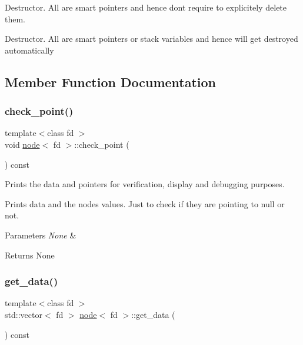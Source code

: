 Destructor. All are smart pointers and hence don\textquotesingle{}t require to explicitely delete them. 

Destructor. All are smart pointers or stack variables and hence will get destroyed automatically 

\subsection{Member Function Documentation}
\mbox{\label{classnode_a23e97fe46ab935948abbcd36f32cb50d}} 
\subsubsection{\texorpdfstring{check\+\_\+point()}{check\_point()}}
{\footnotesize\ttfamily template$<$class fd $>$ \\
void \hyperlink{classnode}{node}$<$ fd $>$\+::check\+\_\+point (\begin{DoxyParamCaption}{ }\end{DoxyParamCaption}) const}



Prints the data and pointers for verification, display and debugging purposes. 

Prints data and the nodes values. Just to check if they are pointing to null or not.


\begin{DoxyParams}{Parameters}
{\em None} & \\
\hline
\end{DoxyParams}
\begin{DoxyReturn}{Returns}
None 
\end{DoxyReturn}
\mbox{\label{classnode_ae9a1d7bf456930b81bba739af8c9044c}} 
\subsubsection{\texorpdfstring{get\+\_\+data()}{get\_data()}}
{\footnotesize\ttfamily template$<$class fd $>$ \\
std\+::vector$<$ fd $>$ \hyperlink{classnode}{node}$<$ fd $>$\+::get\+\_\+data (\begin{DoxyParamCaption}{ }\end{DoxyParamCaption}) const}



